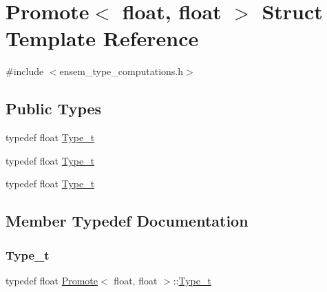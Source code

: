 \hypertarget{structPromote_3_01float_00_01float_01_4}{}\section{Promote$<$ float, float $>$ Struct Template Reference}
\label{structPromote_3_01float_00_01float_01_4}


{\ttfamily \#include $<$ensem\+\_\+type\+\_\+computations.\+h$>$}

\subsection*{Public Types}
\begin{DoxyCompactItemize}
\item 
typedef float \mbox{\hyperlink{structPromote_3_01float_00_01float_01_4_a7a0db669ca1c2569d700f8e431371d30}{Type\+\_\+t}}
\item 
typedef float \mbox{\hyperlink{structPromote_3_01float_00_01float_01_4_a7a0db669ca1c2569d700f8e431371d30}{Type\+\_\+t}}
\item 
typedef float \mbox{\hyperlink{structPromote_3_01float_00_01float_01_4_a7a0db669ca1c2569d700f8e431371d30}{Type\+\_\+t}}
\end{DoxyCompactItemize}


\subsection{Member Typedef Documentation}
\mbox{\label{structPromote_3_01float_00_01float_01_4_a7a0db669ca1c2569d700f8e431371d30}} 
\subsubsection{\texorpdfstring{Type\_t}{Type\_t}\hspace{0.1cm}{\footnotesize\ttfamily [1/3]}}
{\footnotesize\ttfamily typedef float \mbox{\hyperlink{structPromote}{Promote}}$<$ float, float $>$\+::\mbox{\hyperlink{structPromote_3_01float_00_01float_01_4_a7a0db669ca1c2569d700f8e431371d30}{Type\+\_\+t}}}

\mbox{\label{structPromote_3_01float_00_01float_01_4_a7a0db669ca1c2569d700f8e431371d30}} 

